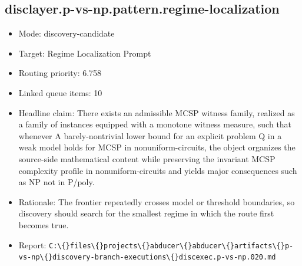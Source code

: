 \documentclass[11pt]{article}
\begin{document}
\subsection*{disclayer.p-vs-np.pattern.regime-localization}
\begin{itemize}
\item Mode: discovery-candidate
\item Target: Regime Localization Prompt
\item Routing priority: 6.758
\item Linked queue items: 10
\item Headline claim: There exists an admissible MCSP witness family, realized as a family of instances equipped with a monotone witness measure, such that whenever A barely-nontrivial lower bound for an explicit problem Q in a weak model holds for MCSP in nonuniform-circuits, the object organizes the source-side mathematical content while preserving the invariant MCSP complexity profile in nonuniform-circuits and yields major consequences such as NP not in P/poly.
\item Rationale: The frontier repeatedly crosses model or threshold boundaries, so discovery should search for the smallest regime in which the route first becomes true.
\item Report: \texttt{C:\textbackslash\{\}files\textbackslash\{\}projects\textbackslash\{\}abducer\textbackslash\{\}abducer\textbackslash\{\}artifacts\textbackslash\{\}p-vs-np\textbackslash\{\}discovery-branch-executions\textbackslash\{\}discexec.p-vs-np.020.md}
\end{itemize}
\end{document}
